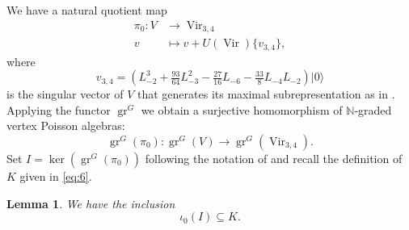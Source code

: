 \documentclass[12pt, reqno]{amsart}
\newtheorem{lemma}[theorem]{Lemma}
\theoremstyle{remark}
\DeclareMathOperator{\Vir}{Vir}
\DeclareMathOperator{\gr}{gr}
\newcommand{\vac}{|0\rangle}
\begin{document}
We have a natural quotient map
\begin{align*}
  \pi_0: V &\to \Vir_{3, 4} \\
  v &\mapsto v + U(\Vir)\{v_{3, 4}\},
\end{align*}
where
\begin{equation*}
  v_{3, 4} = (L_{-2}^3 + \tfrac{93}{64}L_{-3}^2 - \tfrac{27}{16}L_{-6} - \tfrac{33}{8}L_{-4}L_{-2})\vac
\end{equation*}
is the singular vector of $V$ that generates its maximal subrepresentation as in \cite{andrews_singular_2022}.
Applying the functor $\gr^G$ we obtain a surjective homomorphism of $\mathbb{N}$-graded vertex Poisson algebras:
\begin{equation*}
  \gr^G(\pi_0): \gr^G(V) \to \gr^G(\Vir_{3, 4}).
\end{equation*}
Set $I = \ker(\gr^G(\pi_0))$ following the notation of \cite{andrews_singular_2022} and recall the definition of $K$ given in \eqref{eq:6}.

\begin{lemma}
  \label{lmm:9}
  We have the inclusion
  \begin{equation*}
    \iota_0(I) \subseteq K.
  \end{equation*}
\end{lemma}
\end{document}
